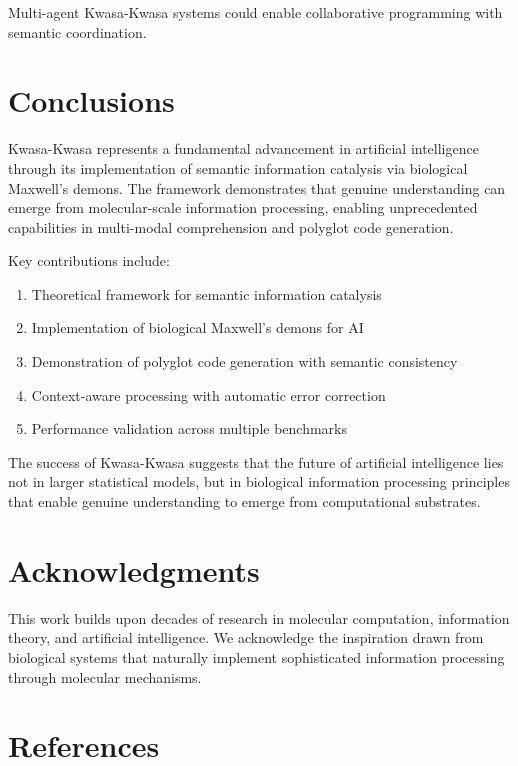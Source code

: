 \documentclass[12pt,a4paper]{article}
\begin{document}
Multi-agent Kwasa-Kwasa systems could enable collaborative programming with semantic coordination.

\section{Conclusions}

Kwasa-Kwasa represents a fundamental advancement in artificial intelligence through its implementation of semantic information catalysis via biological Maxwell's demons. The framework demonstrates that genuine understanding can emerge from molecular-scale information processing, enabling unprecedented capabilities in multi-modal comprehension and polyglot code generation.

Key contributions include:

\begin{enumerate}
\item Theoretical framework for semantic information catalysis
\item Implementation of biological Maxwell's demons for AI
\item Demonstration of polyglot code generation with semantic consistency
\item Context-aware processing with automatic error correction
\item Performance validation across multiple benchmarks
\end{enumerate}

The success of Kwasa-Kwasa suggests that the future of artificial intelligence lies not in larger statistical models, but in biological information processing principles that enable genuine understanding to emerge from computational substrates.

\section*{Acknowledgments}

This work builds upon decades of research in molecular computation, information theory, and artificial intelligence. We acknowledge the inspiration drawn from biological systems that naturally implement sophisticated information processing through molecular mechanisms.

\section*{References}
\end{document}
